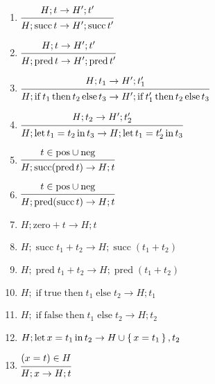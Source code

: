 \documentclass{article}
\DeclareMathOperator{\tsucc}{succ}
\DeclareMathOperator{\tpred}{pred}
\DeclareMathOperator{\tlet}{let}
\DeclareMathOperator{\tin}{in}
\DeclareMathOperator{\tthen}{then}
\DeclareMathOperator{\telse}{else}
\DeclareMathOperator{\tif}{if}
\begin{document}
\begin{enumerate}
        \begin{enumerate}
            \item $
            \begin{prooftree}
                \hypo{H;t\to H';t'}
                \infer1{H; \tsucc t\to H';\tsucc t'}
            \end{prooftree}
            $
            \item $
            \begin{prooftree}
                \hypo{H;t\to H';t'}
                \infer1{H; \tpred t\to H';\tpred t'}
            \end{prooftree}
            $
            \item $
            \begin{prooftree}
                \hypo{H;t_1\to H';t_1'}
                \infer1{H; \tif t_1 \tthen t_2 \telse t_3 \to H'; \tif t_1' \tthen t_2 \telse t_3 }
            \end{prooftree}
            $
            \item $
            \begin{prooftree}
                \hypo{H;t_2\to H'; t_2'}
                \infer1{H; \tlet t_1 = t_2\tin t_3 \to H; \tlet t_1 = t_2'\tin t_3}
            \end{prooftree}
            $
            \item $
            \begin{prooftree}
                \hypo{t \in \mathrm{pos}\cup\mathrm{neg}}
                \infer1{H; \tsucc(\tpred t) \to H; t}
            \end{prooftree}
            $
            \item $
            \begin{prooftree}
                \hypo{t \in \mathrm{pos}\cup\mathrm{neg}}
                \infer1{H; \tpred(\tsucc t) \to H; t}
            \end{prooftree}
            $
            \item $H; \mathrm{zero} + t \to H; t$
            \item $H; \tsucc t_1 + t_2 \to H; \tsucc(t_1 + t_2)$
            \item $H; \tpred t_1 + t_2 \to H; \tpred(t_1 + t_2)$
            \item $H; \tif \mathrm{true} \tthen t_1 \telse t_2 \to H; t_1$
            \item $H; \tif \mathrm{false} \tthen t_1 \telse t_2 \to H; t_2$
            \item $H; \tlet x = t_1\tin t_2 \to H\cup\set{x=t_1}, t_2 $
            \item $
            \begin{prooftree}
                \hypo{(x=t)\in H}
                \infer1{H; x \to H; t}
            \end{prooftree}
            $
        \end{enumerate}


\end{enumerate}
\end{document}
